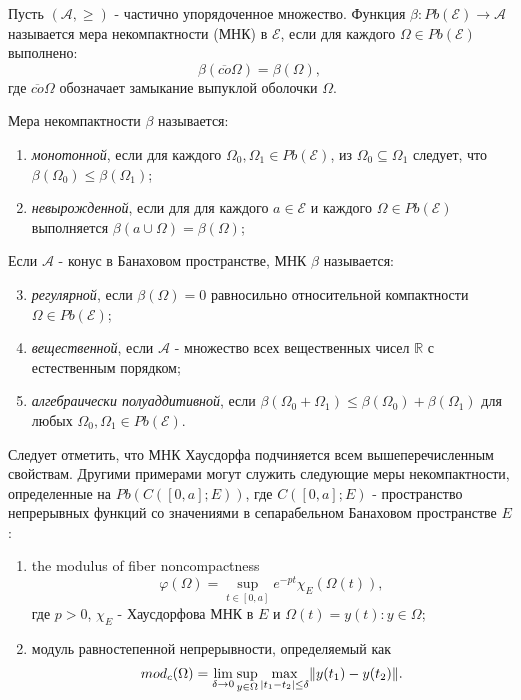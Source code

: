 \begin{definition}
    Пусть $(\mathcal{A}, \geq)$ - частично упорядоченное множество. Функция $\beta : Pb(\mathcal{E}) \rightarrow \mathcal{A}$ называется
    мера некомпактности (МНК) в $\mathcal{E}$, если для каждого $\Omega \in Pb(\mathcal{E})$ выполнено:
    $$\beta(\overline{co}\Omega) = \beta(\Omega),$$
    где $\overline{co}\Omega$ обозначает замыкание выпуклой оболочки $\Omega$.
\end{definition}

Мера некомпактности $\beta$ называется:

\begin{enumerate}
    \item \textit{монотонной}, если для каждого $\Omega_0, \Omega_1 \in Pb(\mathcal{E})$, из $\Omega_0 \subseteq \Omega_1$
    следует, что $\beta(\Omega_0) \leq \beta(\Omega_1)$;
    \item \textit{невырожденной}, если для для каждого $a \in \mathcal{E}$ и каждого $\Omega \in Pb(\mathcal{E})$
    выполняется $\beta({a} \cup \Omega) = \beta(\Omega)$;
\end{enumerate}

Если $\mathcal{A}$ - конус в Банаховом пространстве, МНК $\beta$ называется:

\begin{enumerate}
    \setcounter{enumi}{2}
    \item \textit{регулярной}, если $\beta(\Omega) = 0$ равносильно относительной компактности $\Omega \in Pb(\mathcal{E})$;
    \item \textit{вещественной}, если $\mathcal{A}$ - множество всех вещественных чисел $\mathbb{R}$ с естественным порядком;
    \item \textit{алгебраически полуаддитивной}, если $\beta(\Omega_0 + \Omega_1) \leq \beta(\Omega_0) + \beta(\Omega_1)$ для
    любых $\Omega_0, \Omega_1 \in Pb(\mathcal{E})$.
\end{enumerate}

Следует отметить, что МНК Хаусдорфа подчиняется всем вышеперечисленным свойствам. Другими примерами могут служить следующие
меры некомпактности, определенные на $Pb(C([0, a]; E))$, где $C([0, a]; E)$ - пространство непрерывных функций
со значениями в сепарабельном Банаховом пространстве $E$:

\begin{enumerate}
    \item the modulus of fiber noncompactness
    $$\varphi(\Omega) = \sup_{t \in [0, a]} e^{-pt} \chi_{E}(\Omega(t)),$$
    где $p > 0$, $\chi_{E}$ - Хаусдорфова МНК в $E$ и $\Omega(t) = {y(t): y \in \Omega}$;
    \item модуль равностепенной непрерывности, определяемый как
    $$mod_{c}(\Omega) = \lim_{\delta \rightarrow 0} \sup_{y \in \Omega} \max_{|t_1 - t_2| \leq \delta} \lVert y(t_1) - y(t_2)\rVert.$$
\end{enumerate}


